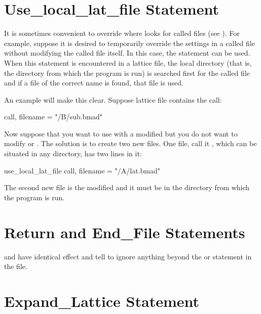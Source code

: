 {{{{{\section{Use_local_lat_file Statement}
\label{s:use.loc}

It is sometimes convenient to override where \bmad looks for called files (see ). For
example, suppose it is desired to temporarily override the settings in a called file without
modifying the called file itself. In this case, the  statement can be
used. When this statement is encountered in a lattice file, the local directory (that is, the
directory from which the program is run) is searched first for the called file and if a file of the
correct name is found, that file is used.

An example will make this clear. Suppose lattice file 
contains the call:
\begin{example}
  call, filename = "/B/sub.bmad"
\end{example}
Now suppose that you want to use  with a modified  but you do not want to
modify  or . The solution is to create two new files. One file, call
it , which can be situated in any directory, has two lines in it:
\begin{example}
  use_local_lat_file
  call, filename = "/A/lat.bmad"
\end{example}
The second new file is the modified  and it must be in the directory from which the
program is run.

\section{Return and End_File Statements}

 and  have identical effect and tell \bmad to ignore anything beyond the
 or  statement in the file.

\section{Expand_Lattice Statement}
\label{s:expand.lat}

}}}}}
